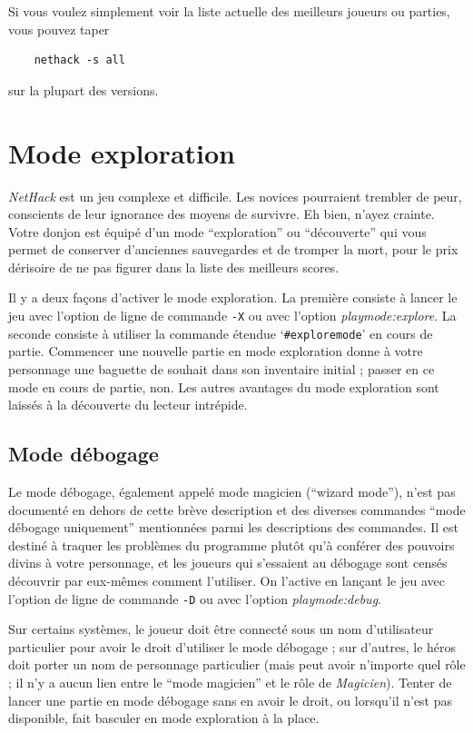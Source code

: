 \documentclass[titlepage]{article}
\begin{document}
Si vous voulez simplement voir la liste actuelle des meilleurs joueurs ou parties,
vous pouvez taper
\begin{verbatim}
    nethack -s all
\end{verbatim}
sur la plupart des versions.

\section{Mode exploration}

\textit{NetHack} est un jeu complexe et difficile.  Les novices pourraient
trembler de peur, conscients de leur ignorance des moyens de survivre.  Eh bien,
n'ayez crainte.  Votre donjon est équipé d'un mode ``exploration'' ou ``découverte''
qui vous permet de conserver d'anciennes sauvegardes et de tromper la mort, pour
le prix dérisoire de ne pas figurer dans la liste des meilleurs scores.

Il y a deux façons d'activer le mode exploration.  La première consiste à lancer
le jeu avec l'option de ligne de commande \texttt{-X}
ou avec l'option
\textit{playmode:explore}.
La seconde consiste à utiliser la commande étendue `\texttt{\#exploremode}' en
cours de partie.  Commencer une nouvelle partie en mode exploration donne à votre
personnage une baguette de souhait dans son inventaire initial ; passer en ce
mode en cours de partie, non.  Les autres avantages du mode exploration sont laissés
à la découverte du lecteur intrépide.

\subsection*{Mode débogage}

Le mode débogage, également appelé mode magicien (``wizard mode''), n'est pas
documenté en dehors de cette brève description et des diverses commandes
``mode débogage uniquement'' mentionnées parmi les descriptions des commandes.
Il est destiné à traquer les problèmes du
programme plutôt qu'à conférer des pouvoirs divins à votre personnage, et
les joueurs qui s'essaient au débogage sont censés découvrir par eux-mêmes
comment l'utiliser.
On l'active en lançant le jeu avec l'option de ligne de commande
\texttt{-D}
ou avec l'option
\textit{playmode:debug}.

Sur certains systèmes, le joueur doit être connecté
sous un nom d'utilisateur particulier pour avoir le droit d'utiliser le mode débogage ;
sur d'autres, le héros doit porter un nom de personnage particulier (mais peut avoir
n'importe quel rôle ; il n'y a aucun lien entre le ``mode magicien'' et le rôle de \textit{Magicien}).
Tenter de lancer une partie en mode débogage sans en avoir le droit,
ou lorsqu'il n'est pas disponible, fait basculer en mode exploration à la place.
\end{document}
